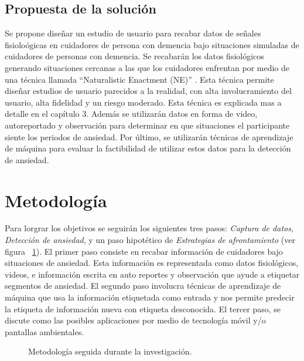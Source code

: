 \subsection{Propuesta de la soluci\'on}
	Se propone dise\~nar un estudio de usuario para recabar datos de se\~nales fisiolo\'ogicas en cuidadores de persona con demencia bajo situaciones simuladas de cuidadores de personas con demencia. Se recabar\'an los datos fisiol\'ogicos generando situaciones cercanas a las que los cuidadores enfrentan por medio de una t\'ecnica llamada ``Naturalistic Enactment (NE)'' \citep{Castro11}. Esta t\'ecnica permite dise\~nar estudios de usuario parecidos a la realidad, con alta involucramiento del usuario, alta fidelidad y un riesgo moderado. Esta t\'ecnica es explicada mas a detalle en el cap\'itulo 3. Adem\'as se utilizar\'an datos en forma de video, autoreportado y observaci\'on para determinar en que situaciones el participante siente los periodos de ansiedad. Por \'ultimo, se utilizar\'an t\'ecnicas de aprendizaje de m\'aquina para evaluar la factibilidad de utilizar estos datos para la detecci\'on de ansiedad.

\section{Metodolog\'ia }\label{secc:methodology}
Para lorgrar los objetivos se seguir\'an los siguientes tres pasos: \textit{Captura de datos}, \textit{Detecci\'on de ansiedad}, y un paso hipot\'etico de \textit{Estrategias de afrontamiento} (ver figura ~\ref{fig:metodology}). El primer paso consiste en recabar informaci\'on de cuidadores bajo situaciones de ansiedad. Esta informaci\'on es representada como datos fisiol\'ogicos, videos, e informaci\'on escrita en auto reportes y observaci\'on que ayude a etiquetar segmentos de ansiedad. El segundo paso involucra t\'ecnicas de aprendizaje de m\'aquina que usa la informaci\'on etiquetada como entrada y nos permite predecir la etiqueta de informaci\'on nueva con etiqueta desconocida. El tercer paso, se discute como las posibles aplicaciones por medio de tecnolog\'ia m\'ovil y/o pantallas ambientales.
\begin{figure}[h!]
        \centering
        \caption{Metodolog\'ia seguida durante la investigaci\'on.} \label{fig:metodology}
\end{figure}
